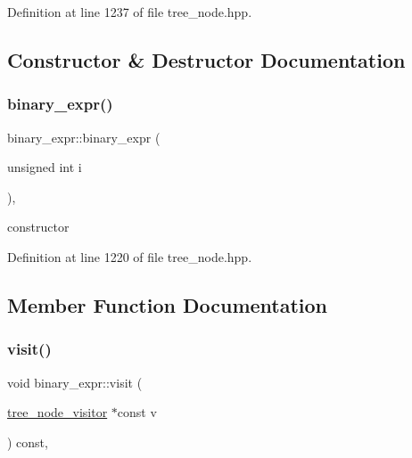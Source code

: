 Definition at line 1237 of file tree\+\_\+node.\+hpp.



\subsection{Constructor \& Destructor Documentation}
\mbox{\label{structbinary__expr_ac4ccf0e5d5c6edf00ce268c41b04038f}} 
\subsubsection{\texorpdfstring{binary\+\_\+expr()}{binary\_expr()}}
{\footnotesize\ttfamily binary\+\_\+expr\+::binary\+\_\+expr (\begin{DoxyParamCaption}\item[{unsigned int}]{i }\end{DoxyParamCaption})\hspace{0.3cm}{\ttfamily [inline]}, {\ttfamily [explicit]}}



constructor 



Definition at line 1220 of file tree\+\_\+node.\+hpp.



\subsection{Member Function Documentation}
\mbox{\label{structbinary__expr_a01572c9c6e0d6bee6dadbb1a074cd075}} 
\subsubsection{\texorpdfstring{visit()}{visit()}}
{\footnotesize\ttfamily void binary\+\_\+expr\+::visit (\begin{DoxyParamCaption}\item[{\hyperlink{classtree__node__visitor}{tree\+\_\+node\+\_\+visitor} $\ast$const}]{v }\end{DoxyParamCaption}) const\hspace{0.3cm}{\ttfamily [override]}, {\ttfamily [virtual]}}



